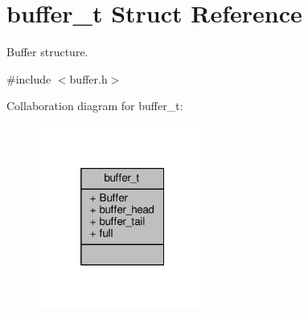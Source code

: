 \hypertarget{structbuffer__t}{\section{buffer\+\_\+t Struct Reference}
\label{structbuffer__t}
}


Buffer structure.  




{\ttfamily \#include $<$buffer.\+h$>$}



Collaboration diagram for buffer\+\_\+t\+:
\nopagebreak
\begin{figure}[H]
\begin{center}
\leavevmode
\includegraphics[width=157pt]{structbuffer__t__coll__graph}
\end{center}
\end{figure}
